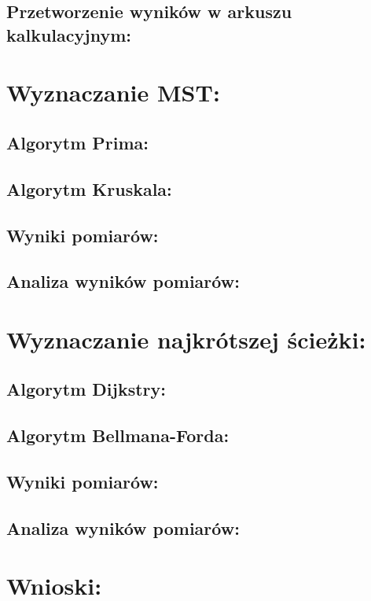 \documentclass[a4paper,12pt]{article}
\begin{document}
\subsection{Przetworzenie wyników w arkuszu kalkulacyjnym:}

\section{Wyznaczanie MST:}

\subsection{Algorytm Prima:}

\subsection{Algorytm Kruskala:}

\subsection{Wyniki pomiarów:}

\subsection{Analiza wyników pomiarów:}

\section{Wyznaczanie najkrótszej ścieżki:}

\subsection{Algorytm Dijkstry:}

\subsection{Algorytm Bellmana-Forda:}

\subsection{Wyniki pomiarów:}

\subsection{Analiza wyników pomiarów:}

\section{Wnioski:}
\end{document}
